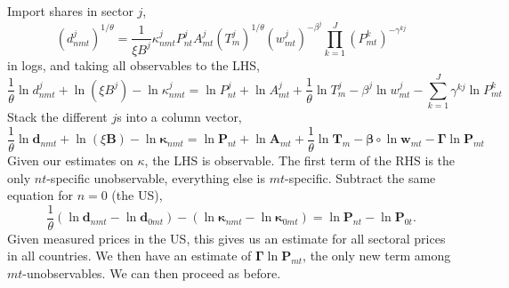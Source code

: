\documentclass[12pt]{article}
\begin{document}
Import shares in sector $j$,
\[
(d_{nmt}^{j})^{1/\theta} = \frac 1 {\xi B^j}
	\kappa_{nmt}^j
	P_{nt}^j A_{mt}^j (T_m^j)^{1/\theta}
	(w_{mt}^j)^{-\beta^j}
	\prod_{k=1}^J
		(P_{mt}^k)^{-\gamma^{kj}}
\]
in logs, and taking all observables to the LHS,
\[
\frac 1\theta \ln d_{nmt}^{j}
+ \ln(\xi B^j)
-\ln \kappa_{nmt}^j
	=
	\ln P_{nt}^j +\ln A_{mt}^j 
	+ \frac1\theta \ln T_m^j
	-\beta^j\ln w_{mt}^j
	-\sum_{k=1}^J
		\gamma^{kj}\ln P_{mt}^k
\]
Stack the different $j$s into a column vector,
\[
\frac 1\theta \ln \mathbf d_{nmt}
+ \ln(\xi \mathbf B)
-\ln \boldsymbol \kappa_{nmt}
	=
	\ln \mathbf P_{nt} +\ln \mathbf A_{mt} 
	+ \frac1\theta \ln \mathbf T_m
	-\boldsymbol\beta \circ \ln \mathbf w_{mt}
	-\boldsymbol\Gamma \ln \mathbf P_{mt}
\]
Given our estimates on $\kappa$, the LHS is observable. The first term of the RHS is the only $nt$-specific unobservable, everything else is $mt$-specific. Subtract the same equation for $n=0$ (the US),
\[
\frac 1\theta 
	(\ln \mathbf d_{nmt}-\ln \mathbf d_{0mt})
	- (\ln \boldsymbol \kappa_{nmt} - \ln \boldsymbol \kappa_{0mt})
	=
	\ln \mathbf P_{nt} -  \ln \mathbf P_{0t}.
\]
Given measured prices in the US, this gives us an estimate for all sectoral prices in all countries. We then have an estimate of $\boldsymbol\Gamma \ln \mathbf P_{mt}$, the only new term among $mt$-unobservables. We can then proceed as before.
\end{document}
